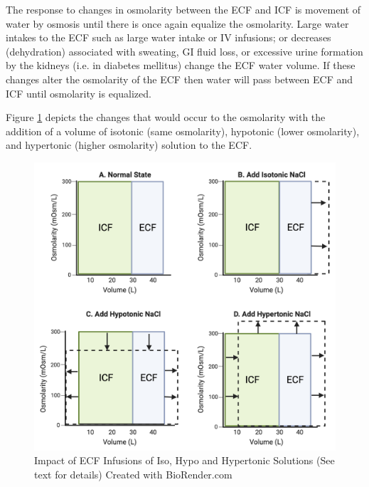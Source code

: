 The response to changes in osmolarity between the ECF and ICF is movement of water by osmosis until there is once again equalize the osmolarity. Large water intakes to the ECF such as large water intake or IV infusions; or decreases (dehydration) associated with sweating, GI fluid loss, or excessive urine formation by the kidneys (i.e. in diabetes mellitus) change the ECF water volume. If these changes alter the osmolarity of the ECF then water will pass between ECF and ICF until osmolarity is equalized.

Figure \ref{fig:iso_hypo_hypertonic} depicts the changes that would occur to the osmolarity with the addition of a volume of isotonic (same osmolarity), hypotonic (lower osmolarity), and hypertonic (higher osmolarity) solution to the ECF.

\begin{figure}[!h]
    \centering
    \includegraphics[width=1\linewidth]{./figure/iso_hypo_hypertonic.png}
    \caption{Impact of ECF Infusions of Iso, Hypo and Hypertonic Solutions (See text for details) \footnotesize{Created with BioRender.com}}
    \label{fig:iso_hypo_hypertonic}
\end{figure}


